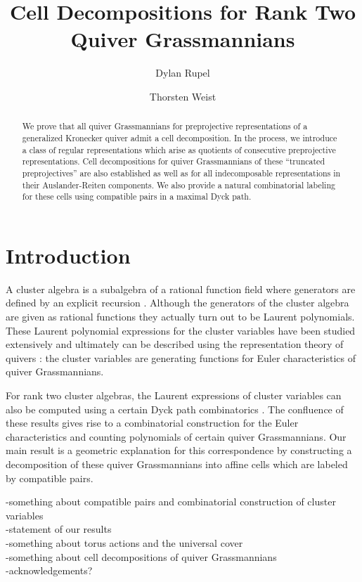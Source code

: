 \documentclass{amsart}
\title{Cell Decompositions for Rank Two Quiver Grassmannians}
\author{Dylan Rupel}
\author{Thorsten Weist}
\begin{document}
\begin{abstract}
  We prove that all quiver Grassmannians for preprojective representations of a generalized Kronecker quiver admit a cell decomposition.  
  In the process, we introduce a class of regular representations which arise as quotients of consecutive preprojective representations.
  Cell decompositions for quiver Grassmannians of these ``truncated preprojectives'' are also established as well as for all indecomposable representations in their Auslander-Reiten components.
  We also provide a natural combinatorial labeling for these cells using compatible pairs in a maximal Dyck path. 
\end{abstract}

\setcounter{tocdepth}{2}

\maketitle

\tableofcontents
\section{Introduction}
A cluster algebra is a subalgebra of a rational function field where generators are defined by an explicit recursion \cite{fomin-zelevinsky}.
Although the generators of the cluster algebra are given as rational functions they actually turn out to be Laurent polynomials.
These Laurent polynomial expressions for the cluster variables have been studied extensively and ultimately can be described using the representation theory of quivers \cite{caldero-chapoton,caldero-keller}: the cluster variables are generating functions for Euler characteristics of quiver Grassmannians.

For rank two cluster algebras, the Laurent expressions of cluster variables can also be computed using a certain Dyck path combinatorics \cite{lee-li-zelevinsky}.
The confluence of these results gives rise to a combinatorial construction for the Euler characteristics and counting polynomials of certain quiver Grassmannians.
Our main result is a geometric explanation for this correspondence by constructing a decomposition of these quiver Grassmannians into affine cells which are labeled by compatible pairs.

-something about compatible pairs and combinatorial construction of cluster variables\\
-statement of our results\\
-something about torus actions and the universal cover\\
-something about cell decompositions of quiver Grassmannians\\
-acknowledgements?\\
\end{document}
